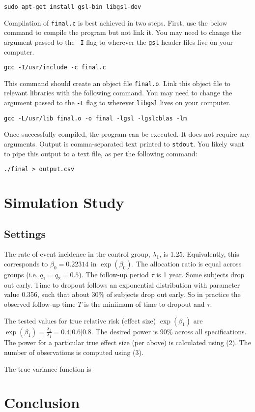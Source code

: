 \documentclass{article}
\begin{document}
\begin{center}
	\texttt{sudo apt-get install gsl-bin libgsl-dev}
\end{center}

Compilation of \texttt{final.c} is best achieved in two steps. First, use the below
command to compile the program but not link it. You may need to change the
argument passed to the \texttt{-I} flag to wherever the \texttt{gsl} header
files live on your computer. 

\begin{center}
	\texttt{gcc -I/usr/include -c final.c}
\end{center}

This command should create an object file \texttt{final.o}. Link this 
object file to relevant libraries with the following command.
You may need to change the argument passed to the \texttt{-L} flag to
wherever \texttt{libgsl} lives on your computer.

\begin{center}
	\texttt{gcc -L/usr/lib final.o -o final -lgsl -lgslcblas -lm}
\end{center}

Once successfully compiled, the program can be executed. It does not require any
arguments. Output is comma-separated text printed to \texttt{stdout}. You likely want to pipe this
output to a text file, as per the following command:

\begin{center}
	\texttt{./final > output.csv}
\end{center}

\section{Simulation Study}

\subsection{Settings}

The rate of event incidence in the control group, $\lambda_1$, is 1.25.
Equivalently, this corresponds to $\beta_0 = 0.22314$ in $\exp{(\beta_0)}$. The
allocation ratio is equal across groups (i.e. $q_1 = q_2 = 0.5$). The follow-up
period $\tau$ is 1 year. Some subjects drop out early. Time to dropout follows
an exponential distribution with parameter value 0.356, such that about 30\% of
subjects drop out early. So in practice the observed follow-up time $T$ is the
miniimum of time to dropout and $\tau$.

The tested values for true relative risk (effect size) $\exp{(\beta_1)}$ are $\exp{(\beta_1)} = \frac{\lambda_2}{\lambda_1}
= 0.4 | 0.6 | 0.8$. The desired power is 90\% across all specifications. 
The power for a particular
true effect size (per above) is calculated using (2). The number of 
observations is computed using (3).

The true variance function is 

\section{Conclusion}

\printbibliography[heading=bibnumbered]
\end{document}
